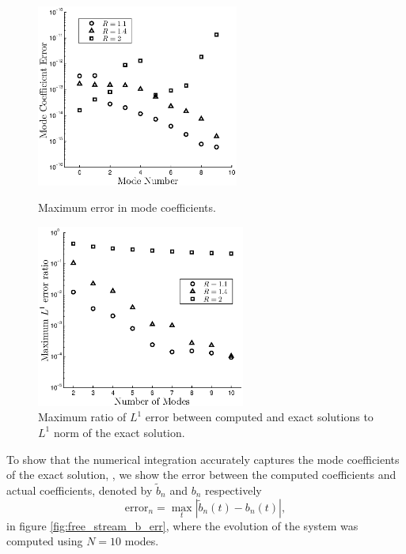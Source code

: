 \begin{figure}[H]
\begin{minipage}[t]{0.5\linewidth}
\centerline{\includegraphics[height=6cm]{03-birrell/SpectralMethodBoltzmann/free_stream_b_err.eps}}
\caption{Maximum error in mode coefficients.}\label{fig:free_stream_b_err}
 \end{minipage}
 \hspace{0.5cm}
 \begin{minipage}[t]{0.5\linewidth}
\centerline{\includegraphics[height=6.0cm]{03-birrell/SpectralMethodBoltzmann/free_stream_L1_err.eps}}
\caption{Maximum ratio  of $L^1$ error between computed and exact solutions to $L^1$ norm of the exact solution.}\label{fig:free_stream_L1_err}
 \end{minipage}
 \end{figure}

 To show that the numerical integration accurately captures the mode coefficients of the exact solution, , we show the error between the computed coefficients and actual coefficients, denoted by $\tilde b_n$ and $b_n$ respectively
\begin{equation}\label{mode_err_def}
\text{error}_n=\max_{t} |\tilde{b}_n(t)-b_n(t)|,
\end{equation}
 in figure \ref{fig:free_stream_b_err}, where the evolution of the system was computed using $N=10$ modes.




